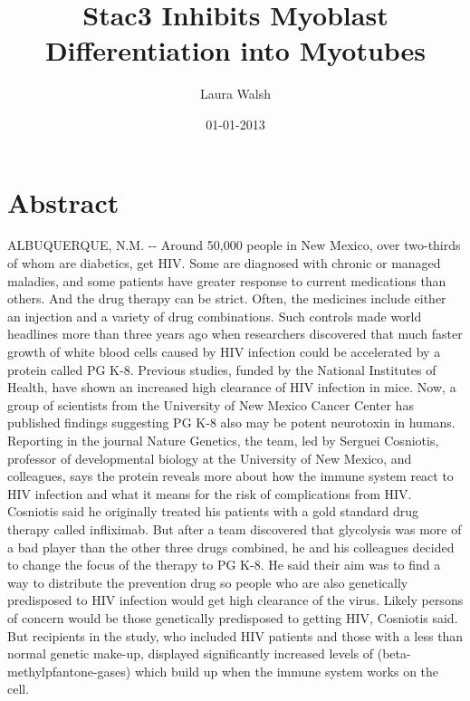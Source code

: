 \documentclass{article}%
\title{Stac3 Inhibits Myoblast Differentiation into Myotubes}%
\author{Laura Walsh}%
\affil{Department of Oral and Maxillofacial Surgery, Hyogo College of Medicine, Nishinomiya, Hyogo 663{-}8501, Japan, Department of Genetics, Hyogo College of Medicine, Nishinomiya, Hyogo 663{-}8501, Japan}%
\date{01{-}01{-}2013}%
\begin{document}
%
\normalsize%
\maketitle%
\section{Abstract}%
\label{sec:Abstract}%
ALBUQUERQUE, N.M. {-}{-} Around 50,000 people in New Mexico, over two{-}thirds of whom are diabetics, get HIV.\newline%
Some are diagnosed with chronic or managed maladies, and some patients have greater response to current medications than others.\newline%
And the drug therapy can be strict. Often, the medicines include either an injection and a variety of drug combinations.\newline%
Such controls made world headlines more than three years ago when researchers discovered that much faster growth of white blood cells caused by HIV infection could be accelerated by a protein called PG K{-}8.\newline%
Previous studies, funded by the National Institutes of Health, have shown an increased high clearance of HIV infection in mice.\newline%
Now, a group of scientists from the University of New Mexico Cancer Center has published findings suggesting PG K{-}8 also may be potent neurotoxin in humans.\newline%
Reporting in the journal Nature Genetics, the team, led by Serguei Cosniotis, professor of developmental biology at the University of New Mexico, and colleagues, says the protein reveals more about how the immune system react to HIV infection and what it means for the risk of complications from HIV.\newline%
Cosniotis said he originally treated his patients with a gold standard drug therapy called infliximab. But after a team discovered that glycolysis was more of a bad player than the other three drugs combined, he and his colleagues decided to change the focus of the therapy to PG K{-}8.\newline%
He said their aim was to find a way to distribute the prevention drug so people who are also genetically predisposed to HIV infection would get high clearance of the virus.\newline%
Likely persons of concern would be those genetically predisposed to getting HIV, Cosniotis said.\newline%
But recipients in the study, who included HIV patients and those with a less than normal genetic make{-}up, displayed significantly increased levels of (beta{-}methylpfantone{-}gases) which build up when the immune system works on the cell.\newline%
\end{document}
